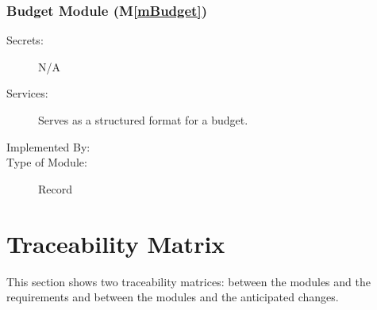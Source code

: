 \documentclass[12pt, titlepage]{article}
\newcommand{\mref}[1]{M\ref{#1}}
\begin{document}
\subsubsection{Budget Module (\mref{mBudget})}

\begin{description}
\item[Secrets:] N/A
\item[Services:] Serves as a structured format for a budget.
\item[Implemented By:] \progname
\item[Type of Module:] Record
\end{description}


\section{Traceability Matrix} \label{SecTM}

This section shows two traceability matrices: between the modules and the
requirements and between the modules and the anticipated changes.
\end{document}
